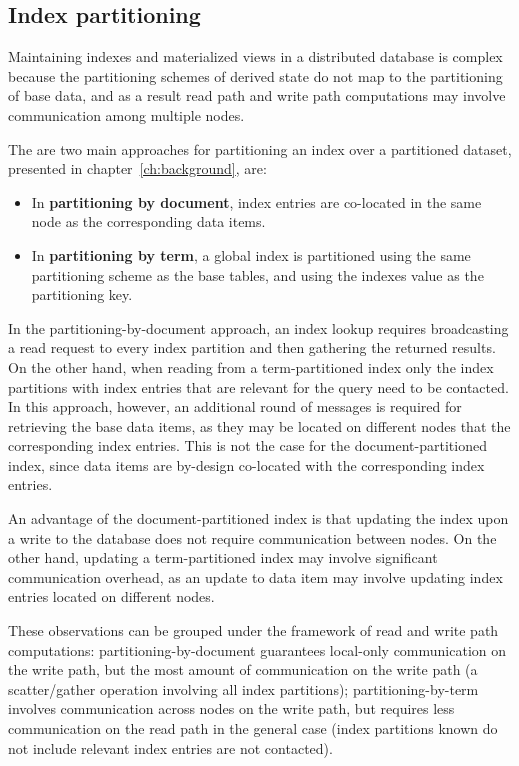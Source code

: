 \subsection{Index partitioning}
\label{sec:index_partitioning}
Maintaining indexes and materialized views in a distributed database is complex because the partitioning schemes of
derived state do not map to the partitioning of base data, and as a result read path and write path computations may
involve communication among multiple nodes.

The are two main approaches for partitioning an index over a partitioned dataset, presented in chapter~\ref{ch:background},
are:
\begin{itemize}

  \item In \textbf{partitioning by document}, index entries are co-located in the same node as the corresponding
  data items.

  \item In \textbf{partitioning by term}, a global index is partitioned using the same partitioning scheme as the base
  tables, and using the indexes value as the partitioning key.

\end{itemize}

In the partitioning-by-document approach, an index lookup requires broadcasting a read request to every index partition
and then gathering the returned results.
On the other hand, when reading from a term-partitioned index only the index partitions with index entries that are
relevant for the query need to be contacted.
In this approach, however, an additional round of messages is required for retrieving the base data items, as they may
be located on different nodes that the corresponding index entries.
This is not the case for the document-partitioned index, since data items are by-design co-located with the corresponding
index entries.

An advantage of the document-partitioned index is that updating the index upon a write to the database does not require
communication between nodes.
On the other hand, updating a term-partitioned index may involve significant communication overhead, as an update to data
item may involve updating index entries located on different nodes.

\bigskip

These observations can be grouped under the framework of read and write path computations:
partitioning-by-document guarantees local-only communication on the write path, but the most amount of communication on
the write path (a scatter/gather operation involving all index partitions);
partitioning-by-term involves communication across nodes on the write path, but requires less communication on the read
path in the general case (index partitions known do not include relevant index entries are not contacted).

